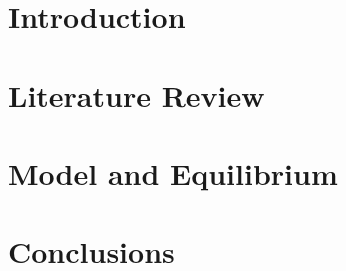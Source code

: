 \documentclass{article}
\providecommand{\unproven}[1]{\textbf{[UNPROVEN: #1]}}
\begin{document}
\section{Introduction}
\section{Literature Review}
\section{Model and Equilibrium}
\section{Conclusions}
\appendix
\end{document}
